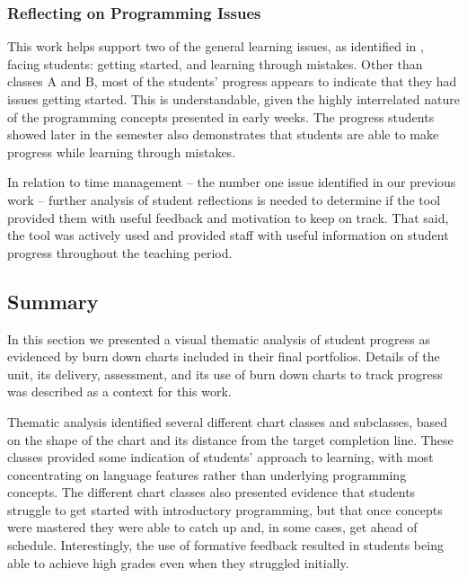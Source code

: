 
\subsubsection{Reflecting on Programming Issues} %
\label{sub:relation_to_issues}

This work helps support two of the general learning issues, as identified in , facing students: getting started, and learning through mistakes. Other than classes A and B, most of the students' progress appears to indicate that they had issues getting started. This is understandable, given the highly interrelated nature of the programming concepts presented in early weeks. The progress students showed later in the semester also demonstrates that students are able to make progress while learning through mistakes. 

In relation to time management -- the number one issue identified in our previous work -- further analysis of student reflections is needed to determine if the tool provided them with useful feedback and motivation to keep on track. That said, the tool was actively used and provided staff with useful information on student progress throughout the teaching period.




\subsection{Summary} %
\label{sec:progress_summary}

In this section we presented a visual thematic analysis of student progress as evidenced by burn down charts included in their final portfolios. Details of the unit, its delivery, assessment, and its use of burn down charts to track progress was described as a context for this work.  

Thematic analysis identified several different chart classes and subclasses, based on the shape of the chart and its distance from the target completion line. These classes provided some indication of students' approach to learning, with most concentrating on language features rather than underlying programming concepts. The different chart classes also presented evidence that students struggle to get started with introductory programming, but that once concepts were mastered they were able to catch up and, in some cases, get ahead of schedule. Interestingly, the use of formative feedback resulted in students being able to achieve high grades even when they struggled initially.


